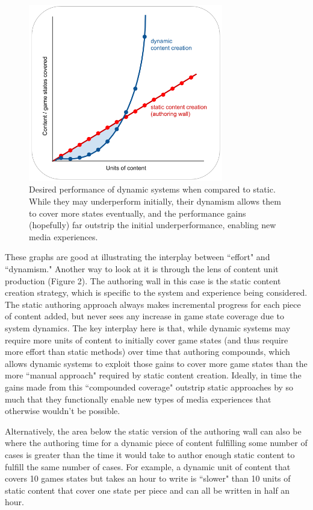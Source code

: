 \begin{figure}
    \centering
    \includegraphics[width=8.5cm]{figures/2.png}
    \caption{Desired performance of dynamic systems when compared to static. While they may underperform initially, their dynamism allows them to cover more states eventually, and the performance gains (hopefully) far outstrip the initial underperformance, enabling new media experiences.}
    \label{fig:authoringWall2}
\end{figure}

These graphs are good at illustrating the interplay between ``effort" and ``dynamism." Another way to look at it is through the lens of content unit production (Figure 2). The authoring wall in this case is the static content creation strategy, which is specific to the system and experience being considered. The static authoring approach always makes incremental progress for each piece of content added, but never sees any increase in game state coverage due to system dynamics. The key interplay here is that, while dynamic systems may require more units of content to initially cover game states (and thus require more effort than static methods) over time that authoring compounds, which allows dynamic systems to exploit those gains to cover more game states than the more ``manual approach" required by static content creation. Ideally, in time the gains made from this ``compounded coverage" outstrip static approaches by so much that they functionally enable new types of media experiences that otherwise wouldn't be possible.

Alternatively, the area below the static version of the authoring wall can also be where the authoring time for a dynamic piece of content fulfilling some number of cases is greater than the time it would take to author enough static content to fulfill the same number of cases. For example, a dynamic unit of content that covers 10 games states but takes an hour to write is ``slower" than 10 units of static content that cover one state per piece and can all be written in half an hour.

